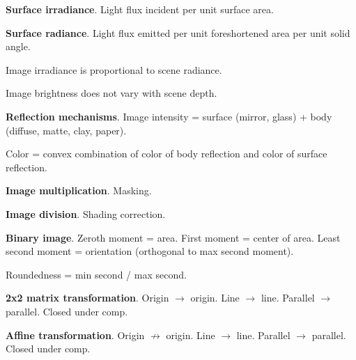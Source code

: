 \documentclass[twocolumn]{zett}
\begin{document}
\begin{node}
  \textbf{Surface irradiance}.
  Light flux incident per unit surface area.
\end{node}

\begin{node}
  \textbf{Surface radiance}.
  Light flux emitted per unit foreshortened area per unit solid angle.
\end{node}

\begin{node}
  Image irradiance is proportional to scene radiance.
\end{node}

\begin{node}
  Image brightness does not vary with scene depth.
\end{node}

\begin{node}
  \textbf{Reflection mechanisms}.
  Image intensity = surface (mirror, glass) + body (diffuse, matte, clay, paper).
\end{node}

\begin{node}
  Color = convex combination of color of body reflection and color of surface reflection.
\end{node}

\begin{node}
  \textbf{Image multiplication}.
  Masking.
\end{node}

\begin{node}
  \textbf{Image division}.
  Shading correction.
\end{node}

\begin{node}
  \textbf{Binary image}.
  Zeroth moment = area.
  First moment = center of area.
  Least second moment = orientation (orthogonal to max second moment).
\end{node}

\begin{node}
  Roundedness = min second / max second.
\end{node}

\begin{node}
  \textbf{2x2 matrix transformation}.
  Origin $\to$ origin.
  Line $\to$ line.
  Parallel $\to$ parallel.
  Closed under comp.
\end{node}

\begin{node}
  \textbf{Affine transformation}.
  Origin $\not\to$ origin.
  Line $\to$ line.
  Parallel $\to$ parallel.
  Closed under comp.
\end{node}
\end{document}
